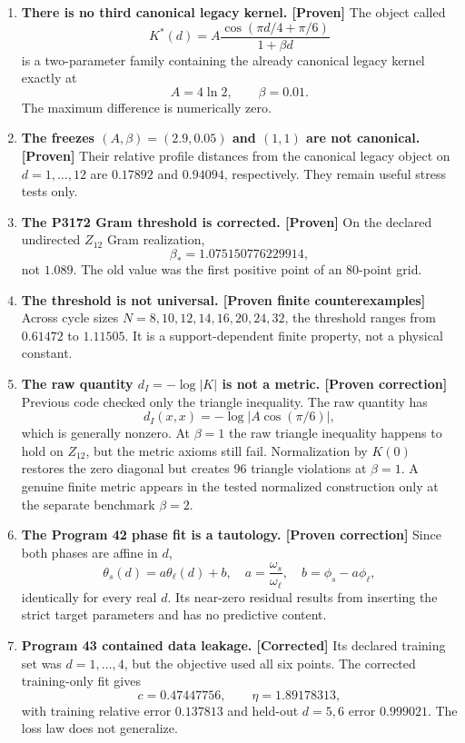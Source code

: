 \documentclass[11pt,a4paper,openany]{report}
\newcommand{\statusProven}{\textcolor{fingreen}{[Proven]}}
\begin{document}
\begin{enumerate}
\item 
\textbf{There is no third canonical legacy kernel. \statusProven{}} The object called \[
   K^*(d)=A\frac{\cos(\pi d/4+\pi/6)}{1+\beta d}
   \] is a two-parameter family containing the already canonical legacy kernel exactly at \[
   A=4\ln2,\qquad \beta=0.01.
   \] The maximum difference is numerically zero.

\item 
\textbf{The freezes \((A,\beta)=(2.9,0.05)\) and \((1,1)\) are not canonical. \statusProven{}} Their relative profile distances from the canonical legacy object on \(d=1,\ldots,12\) are \(0.17892\) and \(0.94094\), respectively. They remain useful stress tests only.

\item 
\textbf{The P3172 Gram threshold is corrected. \statusProven{}} On the declared undirected \(Z_{12}\) Gram realization, \[
   \beta_*=1.075150776229914,
   \] not \(1.089\). The old value was the first positive point of an 80-point grid.

\item 
\textbf{The threshold is not universal. [Proven finite counterexamples]} Across cycle sizes \(N=8,10,12,14,16,20,24,32\), the threshold ranges from \(0.61472\) to \(1.11505\). It is a support-dependent finite property, not a physical constant.

\item 
\textbf{The raw quantity \(d_I=-\log|K|\) is not a metric. [Proven correction]} Previous code checked only the triangle inequality. The raw quantity has \[
   d_I(x,x)=-\log|A\cos(\pi/6)|,
   \] which is generally nonzero. At \(\beta=1\) the raw triangle inequality happens to hold on \(Z_{12}\), but the metric axioms still fail. Normalization by \(K(0)\) restores the zero diagonal but creates 96 triangle violations at \(\beta=1\). A genuine finite metric appears in the tested normalized construction only at the separate benchmark \(\beta=2\).

\item 
\textbf{The Program 42 phase fit is a tautology. [Proven correction]} Since both phases are affine in \(d\), \[
   \theta_s(d)=a\theta_\ell(d)+b,
   \quad
   a=\frac{\omega_s}{\omega_\ell},
   \quad
   b=\phi_s-a\phi_\ell,
   \] identically for every real \(d\). Its near-zero residual results from inserting the strict target parameters and has no predictive content.

\item 
\textbf{Program 43 contained data leakage. [Corrected]} Its declared training set was \(d=1,\ldots,4\), but the objective used all six points. The corrected training-only fit gives \[
   c=0.47447756,\qquad \eta=1.89178313,
   \] with training relative error \(0.137813\) and held-out \(d=5,6\) error \(0.999021\). The loss law does not generalize.


\end{enumerate}
\end{document}
